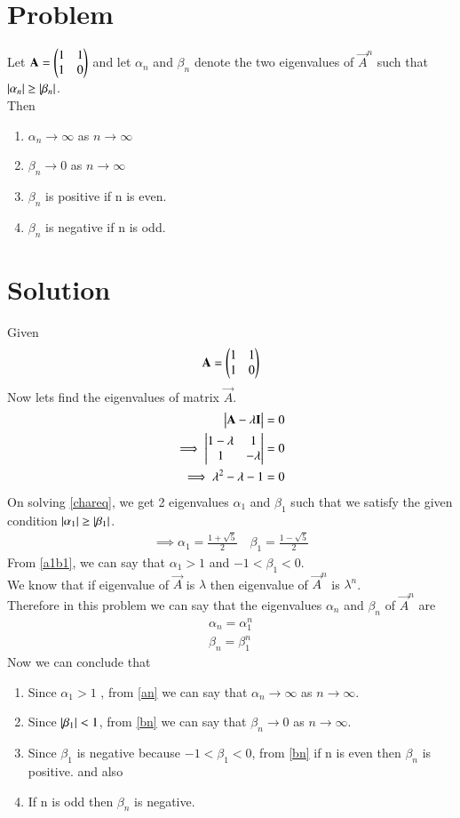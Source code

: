 \documentclass[journal,12pt,twocolumn]{IEEEtran}
\begin{document}
\section{Problem}
Let $\mathbf{A}=\begin{pmatrix}1 & 1\\1 & 0\end{pmatrix}$ and let $\alpha_n$ and $\beta_n$ denote the two eigenvalues of $\vec{A}^n$ such that $\left\vert\alpha_n\right\vert\geq\left\vert\beta_n\right\vert$.\\
Then
\begin{enumerate}
    \item $\alpha_n\rightarrow \infty$ as $n\rightarrow \infty$
    \item $\beta_n\rightarrow 0$ as $n\rightarrow \infty$
    \item $\beta_n$ is positive if n is even.
    \item $\beta_n$ is negative if n is odd.
\end{enumerate}
\section{Solution}
Given
\begin{align}
    \mathbf{A}=\begin{pmatrix}1 & 1\\1 & 0\end{pmatrix}
\end{align}
Now lets find the eigenvalues of matrix $\vec{A}$.
\begin{align}
    \begin{vmatrix}\mathbf{A}-\lambda\mathbf{I}\end{vmatrix}=0\\
    \implies \begin{vmatrix}1-\lambda & 1\\1 & -\lambda\end{vmatrix}=0\\
    \implies \lambda^2-\lambda-1=0\label{chareq}
\end{align}
On solving \eqref{chareq}, we get 2 eigenvalues $\alpha_1$ and $\beta_1$ such that we satisfy the given condition $\left\vert\alpha_1\right\vert\geq\left\vert\beta_1\right\vert$.
\begin{align}
    \implies\alpha_1=\frac{1+\sqrt{5}}{2}\quad\beta_1=\frac{1-\sqrt{5}}{2}\label{a1b1}
\end{align}
From \eqref{a1b1}, we can say that $\alpha_1>1$ and $-1<\beta_1<0$.\\
We know that if eigenvalue of $\vec{A}$ is $\lambda$ then eigenvalue of $\vec{A}^n$ is $\lambda^n$.\\
Therefore in this problem we can say that the eigenvalues $\alpha_n$ and $\beta_n$ of $\vec{A}^n$ are
\begin{align}
    \alpha_n=\alpha_1^n\label{an}\\
    \beta_n=\beta_1^n\label{bn}
\end{align}
Now we can conclude that
\begin{enumerate}
    \item Since $\alpha_1>1$ , from \eqref{an} we can say that $\alpha_n\rightarrow \infty$ as $n\rightarrow \infty$.
    \item Since $\left\vert\beta_1\right\vert<1$, from \eqref{bn} we can say that $\beta_n\rightarrow 0$ as $n\rightarrow \infty$.
    \item Since $\beta_1$ is negative because $-1<\beta_1<0$, from \eqref{bn} if n is even then $\beta_n$ is positive. and also
    \item If n is odd then $\beta_n$ is negative.
\end{enumerate}
\end{document}
